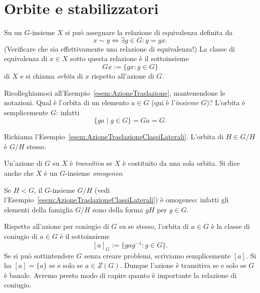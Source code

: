 
\section{Orbite e stabilizzatori}

\begin{defi}\label{defi:Orbite}
Su un $G$-insieme $X$ si può assegnare la relazione di equivalenza definita da
\[x \sim y \iff \exists g \in G : y=gx .\]
(Verificare che sia effettivamente una relazione di equivalenza!) La classe di equivalenza di $x \in X$ sotto questa relazione è il sottoinsieme
\[ Gx:=\{gx :  g\in G\} \]
di $X$ e si chiama {\em orbita} di $x$ rispetto all'azione di $G$.
\end{defi}


\begin{esem}
Ricolleghiamoci all'Esempio~\ref{esem:AzioneTraslazione}, mantenendone le notazioni. Qual è l'orbita di un elemento \(a \in G\) (qui è l'{\em insieme} \(G\))? L'orbita è semplicemente \(G\): infatti
\[\{g a \mid g \in G\} = Ga = G .\]
\end{esem}

\begin{esem}
Richiama l'Esempio~\ref{esem:AzioneTraslazioneClassiLaterali}. L'orbita di \(H \in G/H\) è \(G/H\) stesso.
\end{esem}


\begin{defi}
Un'azione di $G$ su $X$ è {\em transitiva} se $X$ è costituito da una sola orbita. Si dice anche che $X$ è un $G$-insieme {\em omogeneo}.
\end{defi}

\begin{esem}
Se $H<G$, il $G$-insieme $G/H$ (vedi l'Esempio~\ref{esem:AzioneTraslazioneClassiLaterali}) è omogeneo: infatti gli elementi della famiglia $G/H$ sono della forma $gH$ per $g \in G$.
\end{esem}

\begin{esem}
Rispetto all'azione per coniugio di $G$ su se stesso, l'orbita di $a \in G$ è la classe di coniugio di $a \in G$ è il sottoinsieme
\[[a]_G := \{gag^{-1} : g \in G\} .\]
Se si può sottintendere $G$ senza creare problemi, scriviamo semplicemente $[a]$. Si ha $[a] = \{a\}$ se e solo se $a \in Z(G)$. Dunque l'azione è transitiva se e solo se $G$ è banale.  Avremo presto modo di capire quanto è importante la relazione di coniugio.
\end{esem}


